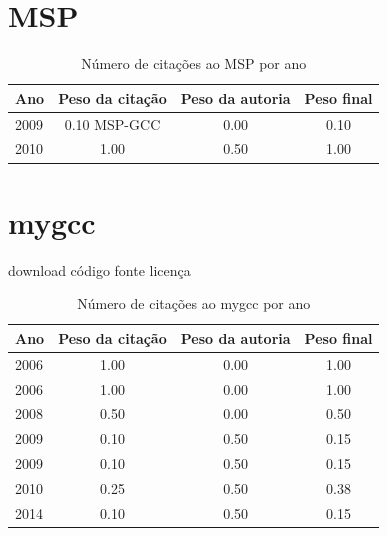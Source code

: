 \section{MSP}
\begin{table}[H]
\caption{Número de citações ao MSP por ano}
\centering
\begin{tabular}{| l | c | c | c |}
  \hline
  Ano & Peso da citação & Peso da autoria & Peso final \\
  \hline
  2009
    & 0.10
          {\tiny MSP-GCC}
    & 0.00
    & {\color{red} 0.10} \\
\hline
  2010
    & 1.00
    & 0.50
    & {\color{blue} 1.00} \\
\hline
\end{tabular}
\end{table}
\section{mygcc}
\checkmark download
\checkmark código fonte
\checkmark licença
\begin{table}[H]
\caption{Número de citações ao mygcc por ano}
\centering
\begin{tabular}{| l | c | c | c |}
  \hline
  Ano & Peso da citação & Peso da autoria & Peso final \\
  \hline
  2006
    & 1.00
    & 0.00
    & {\color{blue} 1.00} \\
  2006
    & 1.00
    & 0.00
    & {\color{blue} 1.00} \\
\hline
  2008
    & 0.50
    & 0.00
    & {\color{blue} 0.50} \\
\hline
  2009
    & 0.10
    & 0.50
    & {\color{red} 0.15} \\
  2009
    & 0.10
    & 0.50
    & {\color{red} 0.15} \\
\hline
  2010
    & 0.25
    & 0.50
    & {\color{red} 0.38} \\
\hline
  2014
    & 0.10
    & 0.50
    & {\color{red} 0.15} \\
\hline
\end{tabular}
\end{table}
